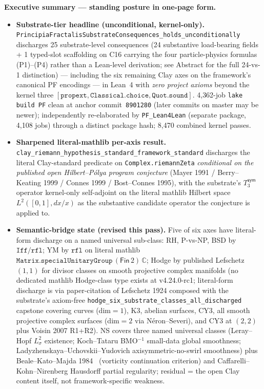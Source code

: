 \documentclass[11pt,a4paper]{amsart}
\theoremstyle{plain}
\theoremstyle{definition}
\begin{document}
\par\medskip\noindent\textbf{Executive summary --- standing posture in one-page form.}
\begin{itemize}[itemsep=2pt,leftmargin=1.4em]
\item \textbf{Substrate-tier headline (unconditional, kernel-only).} \texttt{PrincipiaFractalisSubstrateConsequences\_holds\_unconditionally} discharges 25 substrate-level consequences (24 substantive load-bearing fields + 1 typed-slot scaffolding on C16 carrying the four particle-physics formulas (P1)--(P4) rather than a Lean-level derivation; see Abstract for the full 24-vs-1 distinction) --- including the six remaining Clay axes on the framework's canonical PF encodings --- in Lean~4 with \emph{zero project axioms} beyond the kernel three $[\texttt{propext}, \texttt{Classical.choice}, \texttt{Quot.sound}]$. 4{,}362-job \texttt{lake build PF} clean at anchor commit~\texttt{8901280} (later commits on master may be newer); independently re-elaborated by \texttt{PF\_Lean4Lean} (separate package, 4{,}108 jobs) through a distinct package hash; 8{,}470 combined kernel passes.
\item \textbf{Sharpened literal-mathlib per-axis result.} \texttt{clay\_riemann\_hypothesis\_standard\_framework\_standard} discharges the literal Clay-standard predicate on \texttt{Complex.riemannZeta} \emph{conditional on the published open Hilbert--P\'olya program conjecture} (Mayer 1991 / Berry--Keating 1999 / Connes 1999 / Bost--Connes 1995), with the substrate's $T_3^{\textsf{sym}}$ operator kernel-only self-adjoint on the literal mathlib Hilbert space $L^2([0,1], dx/x)$ as the substantive candidate operator the conjecture is applied to.
\item \textbf{Semantic-bridge state (revised this pass).} Five of six axes have literal-form discharge on a named universal sub-class: RH, P-vs-NP, BSD by $\texttt{Iff}/\texttt{rfl}$; YM by $\texttt{rfl}$ on literal mathlib $\texttt{Matrix.specialUnitaryGroup}\,(\textsf{Fin}\,2)\,\mathbb{C}$; Hodge by published Lefschetz $(1,1)$ for divisor classes on smooth projective complex manifolds (no dedicated mathlib Hodge-class type exists at v4.24.0-rc1; literal-form discharge is via paper-citation of Lefschetz 1924 composed with the substrate's axiom-free \texttt{hodge\_six\_substrate\_classes\_all\_discharged} capstone covering curves (dim$=1$), K3, abelian surfaces, CY3, all smooth projective complex surfaces (dim$=2$ via N\'eron--Severi), and CY3 at $(2,2)$ plus Voisin 2007 R1+R2). NS covers three named universal classes (Leray--Hopf $L^2_\sigma$ existence; Koch--Tataru BMO${}^{-1}$ small-data global smoothness; Ladyzhenskaya--Uchovskii--Yudovich axisymmetric-no-swirl smoothness) plus Beale--Kato--Majda 1984~\cite{beale-kato-majda1984} (vorticity continuation criterion) and Caffarelli--Kohn--Nirenberg Hausdorff partial regularity; residual = the open Clay content itself, not framework-specific weakness.

\end{itemize}
\end{document}
